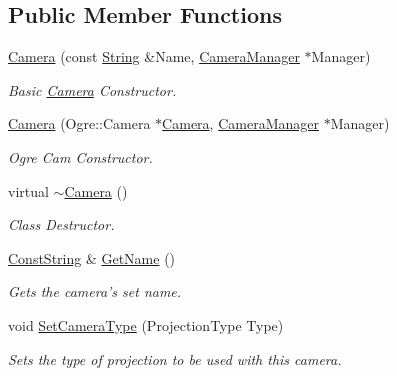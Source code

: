 \subsection*{Public Member Functions}
\begin{DoxyCompactItemize}
\item 
\hyperlink{classphys_1_1Camera_a863e7b7a0fb4db7969014d8391b5ca30}{Camera} (const \hyperlink{namespacephys_aa03900411993de7fbfec4789bc1d392e}{String} \&Name, \hyperlink{classphys_1_1CameraManager}{CameraManager} $\ast$Manager)
\begin{DoxyCompactList}\small\item\em Basic \hyperlink{classphys_1_1Camera}{Camera} Constructor. \item\end{DoxyCompactList}\item 
\hyperlink{classphys_1_1Camera_a0510d4f9bf6fb195115272cbd116e8dd}{Camera} (Ogre::Camera $\ast$\hyperlink{classphys_1_1Camera}{Camera}, \hyperlink{classphys_1_1CameraManager}{CameraManager} $\ast$Manager)
\begin{DoxyCompactList}\small\item\em Ogre Cam Constructor. \item\end{DoxyCompactList}\item 
virtual \hyperlink{classphys_1_1Camera_aa45f340a6f7ba0970aa2602a928463ea}{$\sim$Camera} ()
\begin{DoxyCompactList}\small\item\em Class Destructor. \item\end{DoxyCompactList}\item 
\hyperlink{namespacephys_a5ce5049f8b4bf88d6413c47b504ebb31}{ConstString} \& \hyperlink{classphys_1_1Camera_adf1ca87e0189ad26095eee95704cf77b}{GetName} ()
\begin{DoxyCompactList}\small\item\em Gets the camera's set name. \item\end{DoxyCompactList}\item 
void \hyperlink{classphys_1_1Camera_ac3a8ffec5fa70fa4981fc25815fdc8a3}{SetCameraType} (ProjectionType Type)
\begin{DoxyCompactList}\small\item\em Sets the type of projection to be used with this camera. \item\end{DoxyCompactList}\item 

\end{DoxyCompactItemize}
